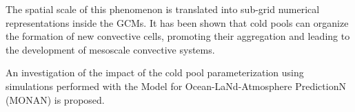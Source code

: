 \begin{resumo}
The spatial scale of this phenomenon is translated into sub-grid numerical representations inside the GCMs. It has been shown that cold pools can organize the formation of new convective cells, promoting their aggregation and leading to the development of mesoscale convective systems.  

An investigation of the impact of the cold pool parameterization using simulations performed with the Model for Ocean-LaNd-Atmosphere PredictionN (MONAN) is proposed. %


 
\end{resumo}